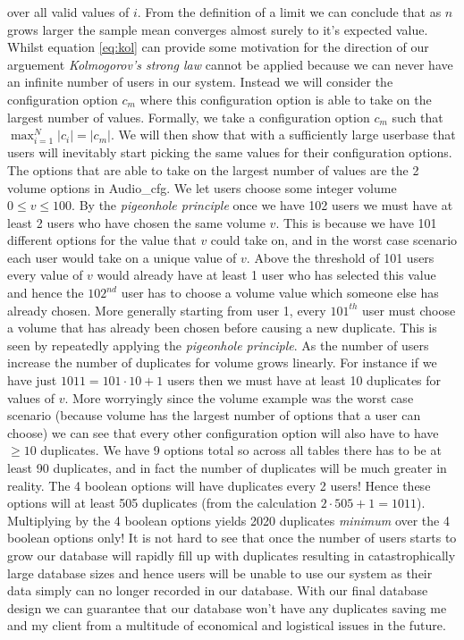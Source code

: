 over all valid values of $i$. From the definition of a limit
we can conclude that as $n$ grows larger the sample mean 
converges almost surely to it's expected value. Whilst
equation \ref{eq:kol} can provide some motivation for the 
direction of our arguement \textit{Kolmogorov's strong law}
cannot be applied because we can never have an infinite number
of users in our system. Instead we will consider the
configuration option $c_m$ where this configuration option is
able to take on the largest number of values. Formally, we
take a configuration option $c_m$ such that
$\max_{i=1}^{N} |c_i| = |c_m|$. We will then show that with a 
sufficiently large userbase that users will inevitably start
picking the same values for their configuration options. The 
options that are able to take on the largest number of values 
are the 2 volume options in {\sffamily Audio\_cfg}. We let 
users choose some integer volume $0 \leq v \leq 100$. By the 
\textit{pigeonhole principle} once we have 102 users we 
must have at least 2 users who have chosen the same 
volume $v$. This is because we have 101 different options for 
the value that $v$ could take on, and in the worst case 
scenario each user would take on a unique value of $v$. Above
the threshold of 101 users every value of $v$ would already 
have at least 1 user who has selected this value and hence the
$102^{nd}$ user has to choose a volume value which someone else
has already chosen. More generally starting from user 1, every
$101^{th}$ user must choose a volume that has already been 
chosen before causing a new duplicate. This is seen by 
repeatedly applying the \textit{pigeonhole principle}. As the
number of users increase the number of duplicates for volume
grows linearly. For instance if we have just 
$1011 = 101 \cdot 10 + 1$ users then we must
have at least 10 duplicates for values of $v$. More worryingly
since the volume example was the worst case scenario (because
volume has the largest number of options that a user can 
choose) we can see that every other configuration option will 
also have to have $\geq 10$ duplicates. We have 9 options 
total so across all tables there has to be at least 90
duplicates, and in fact the number of duplicates will be much 
greater in reality. The 4 boolean options will have
duplicates every 2 users! Hence these options will at least
505 duplicates (from the calculation $2 \cdot 505 + 1 = 1011$).
Multiplying by the 4 boolean options yields 2020 duplicates
\textit{minimum} over the 4 boolean options only! It is not 
hard to see that once the number of users starts to grow our
database will rapidly fill up with duplicates resulting in
catastrophically large database sizes and hence users will be
unable to use our system as their data simply can no longer  
recorded in our database. With our final database design we 
can guarantee that our database won't have any duplicates 
saving me and my client from a multitude of economical and 
logistical issues in the future. \\ \vspace{0.2cm}


